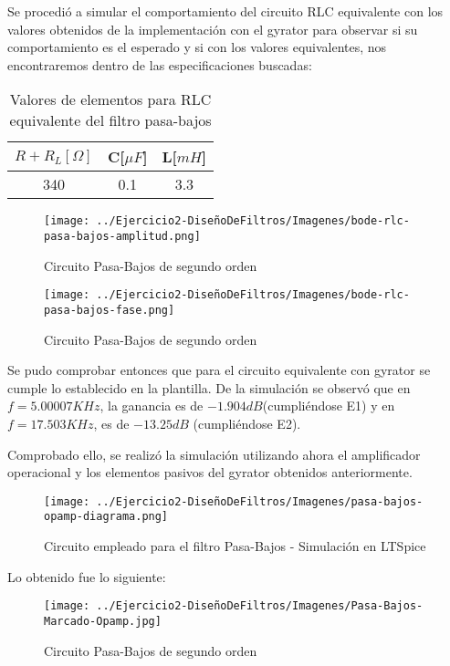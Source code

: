 Se procedió a simular el comportamiento del circuito RLC equivalente con los valores obtenidos de la implementación con el 
gyrator para observar si su comportamiento es el esperado y si con los valores equivalentes, nos encontraremos dentro de las especificaciones
buscadas:

\begin{table}[H]
    \centering
    \begin{tabular}{|c|c|c|}
    \hline
    \rowcolor[HTML]{C0C0C0} 
    $R+R_L[\Omega]$ & C[$\mu F$] & L[$mH$]  \\ \hline
    340      & 0.1  & 3.3 \\ \hline
    \end{tabular}
    \caption{Valores de elementos para RLC equivalente del filtro pasa-bajos}
    \end{table}

\begin{figure}[H]
    \centering
    \texttt{[image: ../Ejercicio2-DiseñoDeFiltros/Imagenes/bode-rlc-pasa-bajos-amplitud.png]}
    \caption{Circuito Pasa-Bajos de segundo orden}
\end{figure}

\begin{figure}[H]
    \centering
    \texttt{[image: ../Ejercicio2-DiseñoDeFiltros/Imagenes/bode-rlc-pasa-bajos-fase.png]}
    \caption{Circuito Pasa-Bajos de segundo orden}
\end{figure}

Se pudo comprobar entonces que para el circuito equivalente con gyrator se cumple lo establecido en la plantilla.
De la simulación se observó que en $f=5.00007 KHz$, la ganancia es de $-1.904 dB$(cumpliéndose E1) y en $f=17.503KHz$, es de $-13.25 dB$
(cumpliéndose E2).


Comprobado ello, se realizó la simulación utilizando ahora el amplificador operacional y los elementos pasivos del gyrator obtenidos anteriormente.

\begin{figure}[H]
    \centering
    \texttt{[image: ../Ejercicio2-DiseñoDeFiltros/Imagenes/pasa-bajos-opamp-diagrama.png]}
    \caption{Circuito empleado para el filtro Pasa-Bajos - Simulación en LTSpice}
\end{figure}

Lo obtenido fue lo siguiente:

\begin{figure}[H]
    \centering
    \texttt{[image: ../Ejercicio2-DiseñoDeFiltros/Imagenes/Pasa-Bajos-Marcado-Opamp.jpg]}
    \caption{Circuito Pasa-Bajos de segundo orden}
\end{figure}


